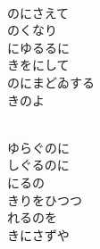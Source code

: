 \documentclass[10pt,b5j]{tarticle} %
\begin{document}
\begin{enumerate}
\begin{minipage}[c]{\blocksize}
    \end{minipage}
    \begin{minipage}[c]{\blocksize}
        
        \vspace{\linespace}
        \item~\\
        のにさえて\\
        のくなり\\
        にゆるるに\\
        きをにして\\
        のにまどゐする\\
        きのよ
        
    \end{minipage}
    \begin{minipage}[c]{\blocksize}
        
        \vspace{\linespace}
        \item~\\
        ゆらぐのに\\
        しぐるのに\\
        にるの\\
        きりをひつつ\\
        れるのを\\
        きにさずや
    
    \end{minipage}
\end{enumerate} %
\end{document}
